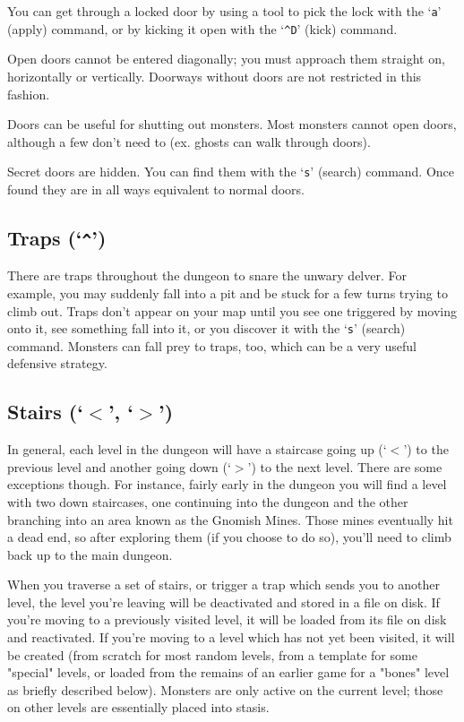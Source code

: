 You can get through a locked door by using a tool to pick the lock
with the `{\tt a}' (apply) command, or by kicking it open with the `{\tt \^{}D}'
(kick) command.

Open doors cannot be entered diagonally; you must approach them
straight on, horizontally or vertically.  Doorways without doors are
not restricted in this fashion.

Doors can be useful for shutting out monsters.  Most monsters cannot
open doors, although a few don't need to (ex. ghosts can walk through
doors).

Secret doors are hidden.  You can find them with the `{\tt s}' (search)
command.  Once found they are in all ways equivalent to normal doors.
\subsection*{Traps (`{\tt \^{}}')}


There are traps throughout the dungeon to snare the unwary delver.
For example, you may suddenly fall into a pit and be stuck for a few
turns trying to climb out.  Traps don't appear on your map until you
see one triggered by moving onto it, see something fall into it, or you
discover it with the `{\tt s}' (search) command.  Monsters can fall prey to
traps, too, which can be a very useful defensive strategy.
\subsection*{Stairs (`{\tt $<$}', `{\tt $>$}')}


In general, each level in the dungeon will have a staircase going up
(`{\tt $<$}') to the previous level and another going down (`{\tt $>$}') to the next
level.  There are some exceptions though.  For instance, fairly early
in the dungeon you will find a level with two down staircases, one
continuing into the dungeon and the other branching into an area
known as the Gnomish Mines.  Those mines eventually hit a dead end,
so after exploring them (if you choose to do so), you'll need to
climb back up to the main dungeon.

When you traverse a set of stairs, or trigger a trap which sends you
to another level, the level you're leaving will be deactivated and
stored in a file on disk.  If you're moving to a previously visited
level, it will be loaded from its file on disk and reactivated.  If
you're moving to a level which has not yet been visited, it will be
created (from scratch for most random levels, from a template for
some "special" levels, or loaded from the remains of an earlier game
for a "bones" level as briefly described below).  Monsters are only
active on the current level; those on other levels are essentially
placed into stasis.

